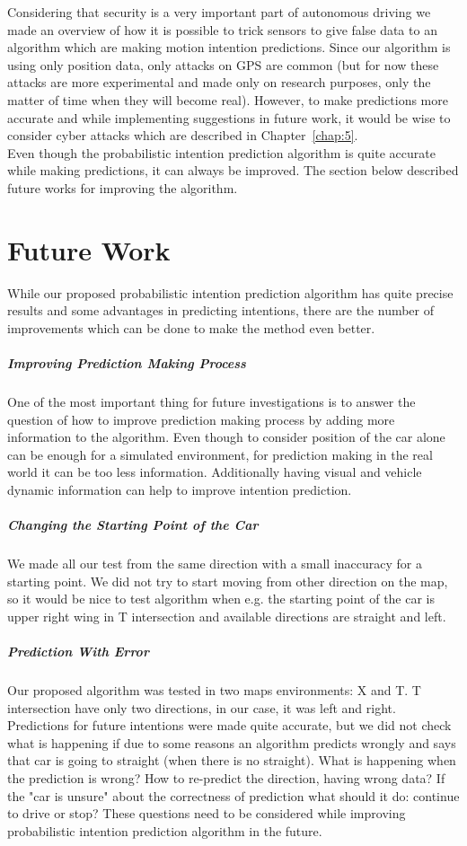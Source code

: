 Considering that security is a very important part of autonomous driving we made an overview of how it is possible to trick sensors to give false data to an algorithm which are making motion intention predictions. Since our algorithm is using only position data, only attacks on \gls{GPS} are common (but for now these attacks are more experimental and made only on research purposes, only the matter of time when they will become real). However, to make predictions more accurate and while implementing suggestions in future work, it would be wise to consider cyber attacks which are described in Chapter~\ref{chap:5}. \\
Even though the probabilistic intention prediction algorithm is quite accurate while making predictions, it can always be improved. The section below described future works for improving the algorithm.

\section{Future Work}

While our proposed probabilistic intention prediction algorithm has quite precise results and some advantages in predicting intentions, there are the number of improvements which can be done to make the method even better.

\subparagraph{Improving Prediction Making Process}

One of the most important thing for future investigations is to answer the question of how to improve prediction making process by adding more information to the algorithm. Even though to consider position of the car alone can be enough for a simulated environment, for prediction making in the real world it can be too less information. Additionally having visual and vehicle dynamic information can help to improve intention prediction.

\subparagraph{Changing the Starting Point of the Car}

We made all our test from the same direction with a small inaccuracy for a starting point. We did not try to start moving from other direction on the map, so it would be nice to test algorithm when e.g. the starting point of the car is upper right wing in T intersection and available directions are straight and left.

\subparagraph{Prediction With Error}

Our proposed algorithm was tested in two maps environments: X and T. T intersection have only two directions, in our case, it was left and right. Predictions for future intentions were made quite accurate, but we did not check what is happening if due to some reasons an algorithm predicts wrongly and says that car is going to straight (when there is no straight). What is happening when the prediction is wrong? How to re-predict the direction, having wrong data? If the "car is unsure" about the correctness of prediction what should it do: continue to drive or stop? These questions need to be considered while improving probabilistic intention prediction algorithm in the future.

